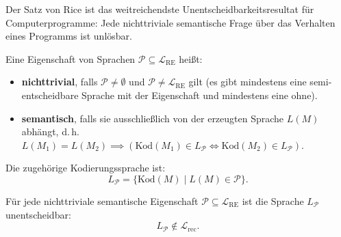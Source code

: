 Der Satz von Rice ist das weitreichendste Unentscheidbarkeitsresultat für Computerprogramme: Jede nichttriviale semantische Frage über das Verhalten eines Programms ist unlösbar.

\begin{definition}
    Eine Eigenschaft von Sprachen $\mathcal{P} \subseteq \mathcal{L}_{\mathrm{RE}}$ heißt:
    \begin{itemize}
        \item \textbf{nichttrivial}, falls $\mathcal{P} \neq \emptyset$ und $\mathcal{P} \neq \mathcal{L}_{\mathrm{RE}}$ gilt (es gibt mindestens eine semi-entscheidbare Sprache mit der Eigenschaft und mindestens eine ohne).
        \item \textbf{semantisch}, falls sie ausschließlich von der erzeugten Sprache $L(M)$ abhängt, d.\,h.\ $L(M_1) = L(M_2) \implies (\mathrm{Kod}(M_1) \in L_{\mathcal{P}} \iff \mathrm{Kod}(M_2) \in L_{\mathcal{P}})$.
    \end{itemize}
    Die zugehörige Kodierungssprache ist:
    \[
        L_{\mathcal{P}} = \{\mathrm{Kod}(M) \mid L(M) \in \mathcal{P}\}.
    \]
\end{definition}

\begin{theorem}
    Für jede nichttriviale semantische Eigenschaft $\mathcal{P} \subseteq \mathcal{L}_{\mathrm{RE}}$ ist die Sprache $L_{\mathcal{P}}$ unentscheidbar:
    \[
        L_{\mathcal{P}} \notin \mathcal{L}_{\mathrm{rec}}.
    \]
\end{theorem}

